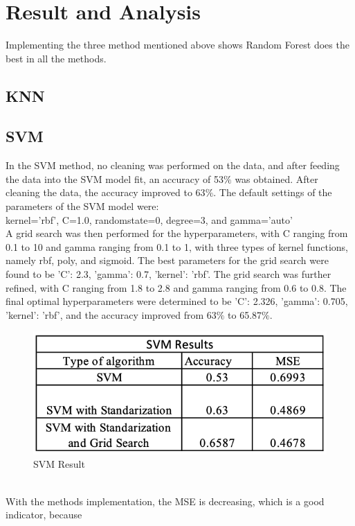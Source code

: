 \documentclass[conference]{IEEEtran}
\begin{document}
{\section{Result and Analysis}
Implementing the three method mentioned above shows Random Forest does the best in all the methods. 
\subsection{KNN}
\subsection{SVM}
In the SVM method, no cleaning was performed on the data, and after feeding the data into the SVM model fit, an accuracy of 53$\%$ was obtained. After cleaning the data, the accuracy improved to 63$\%$. The default settings of the parameters of the SVM model were:\\

kernel='rbf', C=1.0, randomstate=0, degree=3, and gamma='auto' \\

A grid search was then performed for the hyperparameters, with C ranging from 0.1 to 10 and gamma ranging from 0.1 to 1, with three types of kernel functions, namely rbf, poly, and sigmoid. The best parameters for the grid search were found to be {'C': 2.3, 'gamma': 0.7, 'kernel': 'rbf'}. The grid search was further refined, with C ranging from 1.8 to 2.8 and gamma ranging from 0.6 to 0.8. The final optimal hyperparameters were determined to be {'C': 2.326, 'gamma': 0.705, 'kernel': 'rbf'}, and the accuracy improved from 63$\%$ to 65.87$\%$.\\
	\begin{figure}[h]
	\label{fig:foo}
	\begin{center}
	\includegraphics[scale=0.5]{SVMResult.png}
	\caption{SVM Result}
	\end{center}
	\end{figure}\\
With the methods implementation, the MSE is decreasing, which is a good indicator, because 




}
\end{document}
